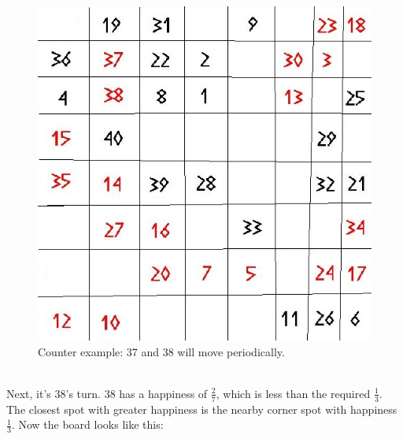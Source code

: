 \begin{figure}[h!]
\begin{center}
\includegraphics[scale=0.25]{Tegenvoorbeeld/segregation_tegenvb_1.jpg}
\end{center}
\caption{Counter example: 37 and 38 will move periodically.}\label{counterexample1}
\end{figure}
\\Next, it's 38's turn. 38 has a happiness of $\frac{2}{7}$, which is less than the required $\frac{1}{3}$. The closest spot with greater happiness is the nearby corner spot with happiness $\frac{1}{3}$. Now the board looks like this:
